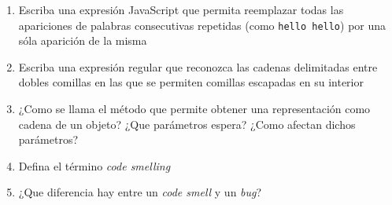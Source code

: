 \documentclass[spanish,a4paper,11pt]{article}
\begin{document}
\begin{enumerate}
\item 
Escriba una expresión JavaScript que permita reemplazar 
todas las apariciones de palabras consecutivas repetidas 
(como \verb|hello hello|)
por una sóla aparición de la misma
%
%
%
\item Escriba una expresión regular que reconozca las cadenas delimitadas entre dobles comillas en las que se permiten comillas escapadas en su interior
%

\item
¿Como se llama el método que permite obtener una representación como cadena de un objeto?
¿Que parámetros espera? ¿Como afectan dichos parámetros?

\item 
Defina el término {\it code smelling}
\item 
¿Que diferencia hay entre un {\it code smell} y un {\it bug}?


\end{enumerate}
\end{document}
